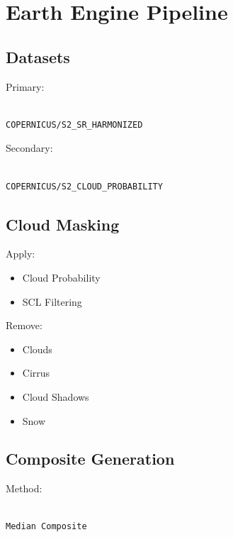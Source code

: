\documentclass[11pt,a4paper]{article}
\begin{document}
\section{Earth Engine Pipeline}

\subsection{Datasets}

Primary:

\begin{verbatim}

COPERNICUS/S2_SR_HARMONIZED

\end{verbatim}

Secondary:

\begin{verbatim}

COPERNICUS/S2_CLOUD_PROBABILITY

\end{verbatim}


\subsection{Cloud Masking}

Apply:

\begin{itemize}
\item Cloud Probability
\item SCL Filtering
\end{itemize}

Remove:

\begin{itemize}
\item Clouds
\item Cirrus
\item Cloud Shadows
\item Snow
\end{itemize}


\subsection{Composite Generation}

Method:

\begin{verbatim}

Median Composite

\end{verbatim}
\end{document}
